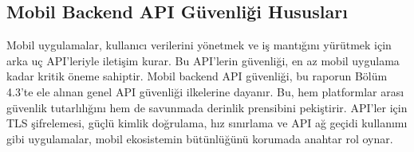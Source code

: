 \subsection{Mobil Backend API Güvenliği Hususları}

Mobil uygulamalar, kullanıcı verilerini yönetmek ve iş mantığını yürütmek için arka uç API'leriyle iletişim kurar. Bu API'lerin güvenliği, en az mobil uygulama kadar kritik öneme sahiptir. Mobil backend API güvenliği, bu raporun Bölüm 4.3'te ele alınan genel API güvenliği ilkelerine dayanır. Bu, hem platformlar arası güvenlik tutarlılığını hem de savunmada derinlik prensibini pekiştirir. API'ler için TLS şifrelemesi, güçlü kimlik doğrulama, hız sınırlama ve API ağ geçidi kullanımı gibi uygulamalar, mobil ekosistemin bütünlüğünü korumada anahtar rol oynar.
